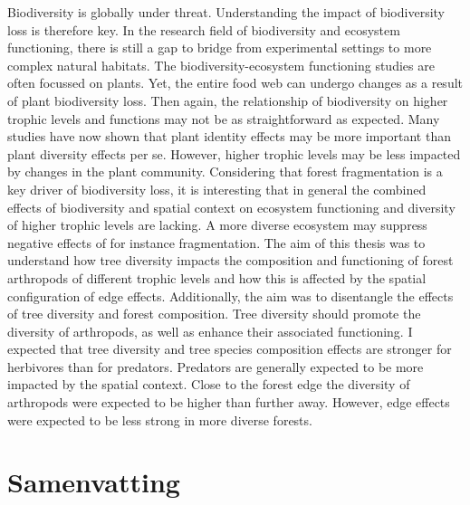 \documentclass[b5paper,10pt]{book} %
\begin{document}
	Biodiversity is globally under threat. Understanding the impact of biodiversity loss is therefore key. In the research field of biodiversity and ecosystem functioning, there is still a gap to bridge from experimental settings to more complex natural habitats. The biodiversity-ecosystem functioning studies are often focussed on plants. Yet, the entire food web can undergo changes as a result of plant biodiversity loss. Then again, the relationship of biodiversity on higher trophic levels and functions may not be as straightforward as expected. Many studies have now shown that plant identity effects may be more important than plant diversity effects per se. However, higher trophic levels may be less impacted by changes in the plant community. Considering that forest fragmentation is a key driver of biodiversity loss, it is interesting that in general the combined effects of biodiversity and spatial context on ecosystem functioning and diversity of higher trophic levels are lacking. A more diverse ecosystem may suppress negative effects of for instance fragmentation. The aim of this thesis was to understand how tree diversity impacts the composition and functioning of forest arthropods of different trophic levels and how this is affected by the spatial configuration of edge effects. Additionally, the aim was to disentangle the effects of tree diversity and forest composition. Tree diversity should promote the diversity of arthropods, as well as enhance their associated functioning. I expected that tree diversity and tree species composition effects are stronger for herbivores than for predators. Predators are generally expected to be more impacted by the spatial context. Close to the forest edge the diversity of arthropods were expected to be higher than further away. However, edge effects were expected to be less strong in more diverse forests.

	
	\newpage
	\thispagestyle{empty}
	\chapter{Samenvatting} 
	
\end{document}
